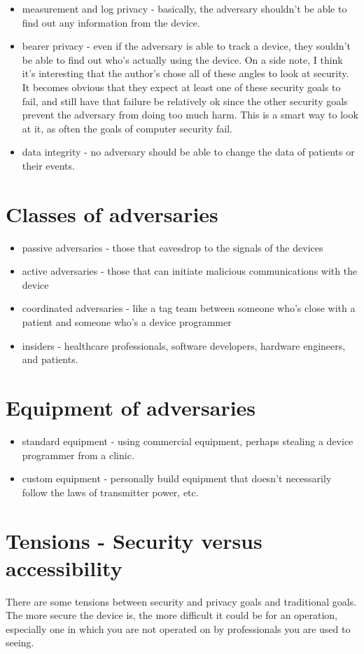 \documentclass{article}
\begin{document}
\begin{itemize}
\begin{itemize}
\item measurement and log privacy - basically, the adversary shouldn't be able to find out any information from the device.
\item bearer privacy - even if the adversary is able to track a device, they souldn't be able to find out who's actually using the device. On a side note, I think it's interesting that the author's chose all of these angles to look at security. It becomes obvious that they expect at least one of these security goals to fail, and still have that failure be relatively ok since the other security goals prevent the adversary from doing too much harm. This is a smart way to look at it, as often the goals of computer security fail.
\item data integrity - no adversary should be able to change the data of patients or their events.
\end{itemize}
\end{itemize}

\section*{Classes of adversaries}
\begin{itemize}
\item passive adversaries - those that eavesdrop to the signals of the devices
\item active adversaries - those that can initiate malicious communications with the device 
\item coordinated adversaries - like a tag team between someone who's close with a patient and someone who's a device programmer
\item insiders - healthcare professionals, software developers, hardware engineers, and patients.
\end{itemize}

\section*{Equipment of adversaries}
\begin{itemize}
\item standard equipment - using commercial equipment, perhaps stealing a device programmer from a clinic.
\item custom equipment - personally build equipment that doesn't necessarily follow the laws of transmitter power, etc.
\end{itemize}

\section*{Tensions - Security versus accessibility}
There are some tensions between security and privacy goals and traditional goals. The more secure the device is, the more difficult it could be for an operation, especially one in which you are not operated on by professionals you are used to seeing. 
\end{document}
